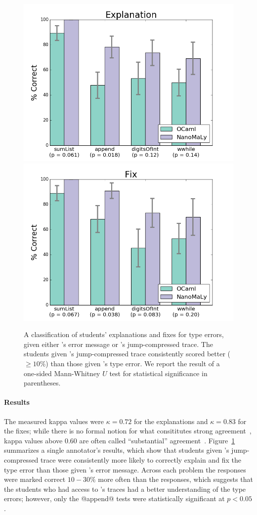 \begin{figure}[t]
\includegraphics[width=0.7\linewidth]{user-study-reason.png}
\includegraphics[width=0.7\linewidth]{user-study-fix.png}
\caption{A classification of students' explanations and fixes for type
  errors, given either \ocaml's error message or \toolname's
  jump-compressed trace. The students given \toolname's jump-compressed
  trace consistently scored better ($\ge 10\%$) than those given
  \ocaml's type error. We report the result of a one-sided Mann-Whitney
  $U$ test for statistical significance in parentheses.}
\label{fig:results-user-study}
\end{figure}

\paragraph{Results}
%
The measured kappa values were $\kappa = 0.72$ for the explanations and
$\kappa = 0.83$ for the fixes; while there is no formal notion for what
consititutes strong agreement~\cite{Krippendorff2012-wd}, kappa values
above $0.60$ are often called ``substantial''
agreement~\cite{Landis1977-ey}.
%
Figure~\ref{fig:results-user-study} summarizes a single annotator's
results, which show that students given \toolname's jump-compressed
trace were consistently more likely to correctly explain
and fix the type error than those given \ocaml's error message.
%
Across each problem the \toolname responses were marked correct
$10-30\%$ more often than the \ocaml responses, which suggests that
the students who had access to \toolname's traces had a better
understanding of the type errors;
%
however, only the @append@ tests were statistically significant at
$p < 0.05$.
%

